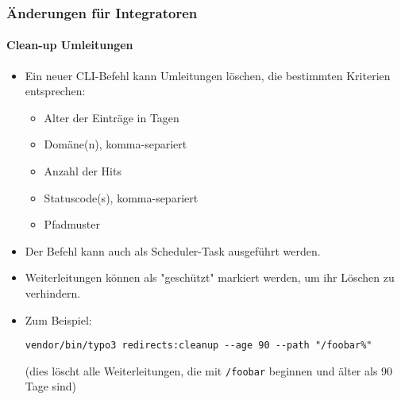%

\begin{frame}[fragile]
	\frametitle{Änderungen für Integratoren}
	\framesubtitle{Clean-up Umleitungen}


	\begin{itemize}
		\item Ein neuer CLI-Befehl kann Umleitungen löschen, die bestimmten Kriterien entsprechen:
			\begin{itemize}
				\item Alter der Einträge in Tagen
				\item Domäne(n), komma-separiert
				\item Anzahl der Hits
				\item Statuscode(s), komma-separiert
				\item Pfadmuster
			\end{itemize}
		\item Der Befehl kann auch als Scheduler-Task ausgeführt werden.
		\item Weiterleitungen können als "geschützt" markiert werden, um ihr Löschen zu verhindern.
		\item Zum Beispiel:
\begin{lstlisting}
vendor/bin/typo3 redirects:cleanup --age 90 --path "/foobar%"
\end{lstlisting}

			\smaller
				(dies löscht alle Weiterleitungen, die mit \texttt{/foobar} beginnen und älter als 90 Tage sind)
			\normalsize

	\end{itemize}
\end{frame}

